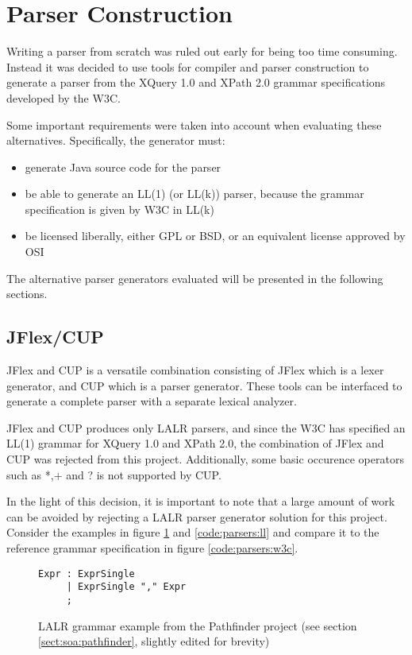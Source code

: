 \section{Parser Construction}
\label{sect:method:alternatives}
Writing a parser from scratch was ruled out early for being too time consuming.
Instead it was decided to use tools for compiler and parser construction to
generate a parser from the XQuery 1.0 and XPath 2.0 grammar  
specifications\cite{w3c01} developed by the W3C.

Some important requirements were taken into account when evaluating these
alternatives. Specifically, the generator must:
\begin{itemize}
  \item generate Java source code for the parser
  \item be able to generate an LL(1) (or LL(k)) parser, because the grammar  
  specification is given by W3C in LL(k)
  \item be licensed liberally, either GPL or BSD, or an equivalent license
  approved by OSI
\end{itemize}

The alternative parser generators evaluated will be presented in the following sections.

\subsection{JFlex/CUP}
JFlex and CUP is a versatile combination consisting of JFlex which is a lexer
generator, and CUP which is a parser generator. These tools can be interfaced to
generate a complete parser with a separate lexical analyzer.

JFlex and CUP produces only LALR parsers, and since the W3C has specified an
LL(1) grammar for XQuery 1.0 and XPath 2.0, the combination of JFlex and CUP was
rejected from this project. Additionally, some basic occurence operators such as
*,+ and ? is not supported by CUP.

In the light of this decision, it is important to note that a large amount of
work can be avoided by rejecting a LALR parser generator solution for this
project. Consider the examples in figure \ref{code:parsers:lalr} and
\ref{code:parsers:ll} and compare it to the reference grammar specification in
figure \ref{code:parsers:w3c}.

\begin{figure}[h!]
\begin{Verbatim}
Expr : ExprSingle
     | ExprSingle "," Expr
     ;
\end{Verbatim}
\caption[LALR grammar example]{LALR grammar example from the Pathfinder project
(see section \ref{sect:soa:pathfinder}, slightly edited for brevity)}
\label{code:parsers:lalr}
\end{figure}

